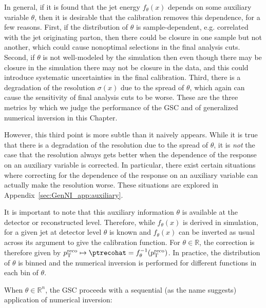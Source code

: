 
In general, if it is found that the jet energy $f_\theta(x)$ depends on some auxiliary variable $\theta$, then it is desirable that the calibration removes this dependence, for a few reasons.
First, if the distribution of $\theta$ is sample-dependent, e.g. correlated with the jet originating parton, then there could be closure in one sample but not another, which could cause nonoptimal selections in the final analysis cuts.
Second, if $\theta$ is not well-modeled by the simulation then even though there may be closure in the simulation there may not be closure in the data, and this could introduce systematic uncertainties in the final calibration.
Third, there is a degradation of the resolution $\sigma(x)$ due to the spread of $\theta$, which again can cause the sensitivity of final analysis cuts to be worse.
These are the three metrics by which we judge the performance of the GSC and of generalized numerical inversion in this Chapter.

However, this third point is more subtle than it naively appears.
While it is true that there is a degradation of the resolution due to the spread of $\theta$, it is \emph{not} the case that the resolution always gets better when the dependence of the response on an auxiliary variable is corrected.
In particular, there exist certain situations where correcting for the dependence of the response on an auxiliary variable can actually make the resolution worse.
These situations are explored in Appendix~\ref{sec:GenNI_app:auxiliary}.

It is important to note that this auxiliary information $\theta$ is available at the detector or reconstructed level.
Therefore, while $f_\theta(x)$ is derived in simulation, for a given jet at detector level $\theta$ is known and $f_\theta(x)$ can be inverted as usual across its argument to give the calibration function.
For $\theta\in\mathbb{R}$, the correction is therefore given by $p_\text{T}^\text{reco}\mapsto \ptrecohat = f_\theta^{-1}(p_\text{T}^\text{reco})$.
In practice, the distribution of $\theta$ is binned and the numerical inversion is performed for different functions in each bin of $\theta$.


When $\theta\in\mathbb{R}^n$, the GSC proceeds with a sequential (as the name suggests) application of numerical inversion:

